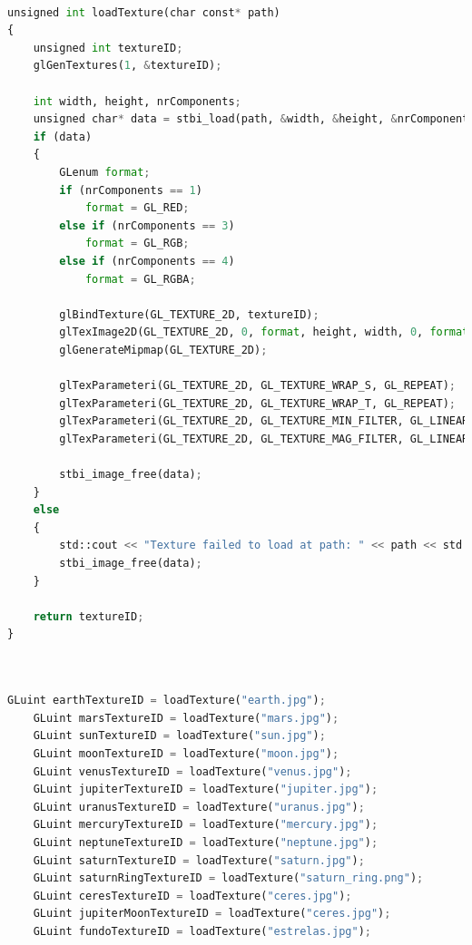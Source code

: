 \documentclass[12pt,a4paper]{memoir}
\begin{document}
\begin{lstlisting}[language=Python, caption=Função de leitura de texturas]

unsigned int loadTexture(char const* path)
{
    unsigned int textureID;
    glGenTextures(1, &textureID);

    int width, height, nrComponents;
    unsigned char* data = stbi_load(path, &width, &height, &nrComponents, 0);
    if (data)
    {
        GLenum format;
        if (nrComponents == 1)
            format = GL_RED;
        else if (nrComponents == 3)
            format = GL_RGB;
        else if (nrComponents == 4)
            format = GL_RGBA;

        glBindTexture(GL_TEXTURE_2D, textureID);
        glTexImage2D(GL_TEXTURE_2D, 0, format, height, width, 0, format, GL_UNSIGNED_BYTE, data);
        glGenerateMipmap(GL_TEXTURE_2D);

        glTexParameteri(GL_TEXTURE_2D, GL_TEXTURE_WRAP_S, GL_REPEAT);
        glTexParameteri(GL_TEXTURE_2D, GL_TEXTURE_WRAP_T, GL_REPEAT);
        glTexParameteri(GL_TEXTURE_2D, GL_TEXTURE_MIN_FILTER, GL_LINEAR_MIPMAP_LINEAR);
        glTexParameteri(GL_TEXTURE_2D, GL_TEXTURE_MAG_FILTER, GL_LINEAR);

        stbi_image_free(data);
    }
    else
    {
        std::cout << "Texture failed to load at path: " << path << std::endl;
        stbi_image_free(data);
    }

    return textureID;
}

\end{lstlisting}

\newpage

\begin{lstlisting}[language=Python, caption=Atribuiçao de texturas]


GLuint earthTextureID = loadTexture("earth.jpg");
    GLuint marsTextureID = loadTexture("mars.jpg");
    GLuint sunTextureID = loadTexture("sun.jpg");
    GLuint moonTextureID = loadTexture("moon.jpg");
    GLuint venusTextureID = loadTexture("venus.jpg");
    GLuint jupiterTextureID = loadTexture("jupiter.jpg");
    GLuint uranusTextureID = loadTexture("uranus.jpg");
    GLuint mercuryTextureID = loadTexture("mercury.jpg");
    GLuint neptuneTextureID = loadTexture("neptune.jpg");
    GLuint saturnTextureID = loadTexture("saturn.jpg");
    GLuint saturnRingTextureID = loadTexture("saturn_ring.png");
    GLuint ceresTextureID = loadTexture("ceres.jpg");
    GLuint jupiterMoonTextureID = loadTexture("ceres.jpg");
    GLuint fundoTextureID = loadTexture("estrelas.jpg");

    \end{lstlisting}
\end{document}
